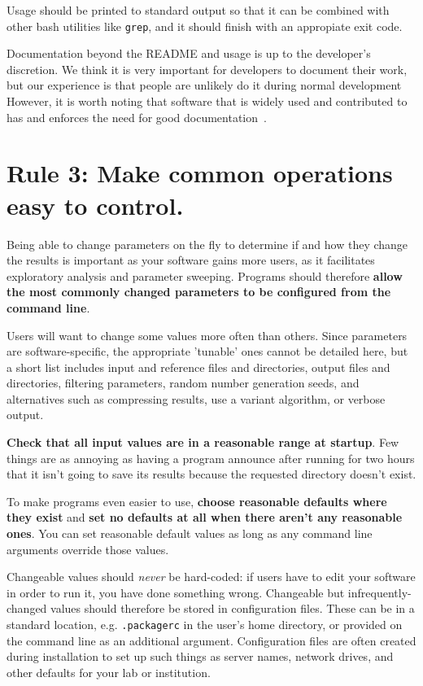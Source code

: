 \documentclass[10pt,letterpaper]{article}
\newcommand{\rulemajor}[1]{\section{#1}}
\newcommand{\ruleminor}[1]{\textbf{#1}}
\begin{document}
Usage should be 
printed to standard output so that it can be 
combined with other bash utilities like \texttt{grep},
and it should finish with an appropiate exit code.

Documentation beyond the README and usage is up to the developer's discretion.
We think it is very important for developers to document their work, but our
experience is that people are unlikely do it during normal development
However, it
is worth noting that software that is widely used and contributed to has and
enforces the need for good documentation~\cite{gentleman2004}.

\rulemajor{Rule 3: Make common operations easy to control.}

Being able to change parameters on the fly to determine if and how
they change the results is important as your software gains more users,
as it facilitates exploratory analysis and parameter sweeping.
Programs should therefore
\ruleminor{allow the most commonly changed parameters to be configured from the command line}.

Users will want to change some values more often than others.
Since parameters are software-specific, the appropriate 'tunable' ones cannot be detailed here,
but a short list includes input and reference files and directories,
output files and directories,
filtering parameters,
random number generation seeds,
and
alternatives such as compressing results,
use a variant algorithm,
or verbose output.

\ruleminor{Check that all input values are in a reasonable range at startup}. 
Few things are as annoying as having a program announce after running for two
hours that it isn't going to save its results because the requested directory
doesn't exist.

To make programs even easier to use,
\ruleminor{choose reasonable defaults where they exist}
and \ruleminor{set no defaults at all when there aren't any reasonable ones}.
You can set reasonable default values
as long as any command line arguments
override those values.

Changeable values should \emph{never} be hard-coded:
if users have to edit your software in order to run it,
you have done something wrong.
Changeable but infrequently-changed values should therefore be stored in configuration files.
These can be in a standard location,
e.g. \texttt{.packagerc} in the user's home directory,
or provided on the command line as an additional argument.
Configuration files are often created during installation
to set up such things as server names,
network drives,
and other defaults for your lab or institution. 
\end{document}
